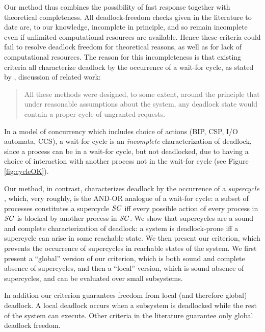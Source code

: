 Our method thus combines the possibility of fast response together with theoretical completeness.
All deadlock-freedom checks given in the literature to date are, to our knowledge, incomplete in
principle, and so remain incomplete even if unlimited computational resources are available.
Hence these criteria could fail to resolve deadlock freedom for theoretical reasons, as well as for 
lack of computational resources.
%
The reason for this incompleteness is that existing criteria all characterize deadlock by the
occurrence of a wait-for cycle, \eg as stated by , discussion of related
work:
\begin{quote}
All these methods were designed, to some extent, around the principle that under reasonable
assumptions about the system, any deadlock state would contain a proper cycle of ungranted requests.
\end{quote}
In a model of concurrency which includes choice of actions
(\eg BIP, CSP, I/O automata, CCS), a wait-for cycle is an \emph{incomplete} characterization of
deadlock, since a process can be in a wait-for cycle, but not deadlocked, due to having a choice of
interaction with another process not in the wait-for cycle (see Figure \ref{fig:cycleOK}).

Our method, in contrast, characterizes deadlock by the occurrence of a \emph{supercycle} \cite{AE98,AC05}, which, very roughly, is the AND-OR analogue
of a wait-for cycle: a subset of processes constitutes a supercycle $\mathit{SC}$ iff every possible action of every process in $\mathit{SC}$ is blocked by another
process in $\mathit{SC}$.
%
We show that supercycles are a sound and complete characterization of deadlock: a system is deadlock-prone iff a supercycle can arise in some
reachable state.
%
We then present our criterion, which prevents the occurrence of supercycles in reachable states of
the system. We first present a ``global'' version of our criterion, which is both sound and complete
\wrt absence of supercycles, and then a ``local'' version, which is sound \wrt absence of
supercycles, and can be evaluated over small subsystems.

In addition our criterion guarantees freedom from local (and therefore global) deadlock. A local deadlock occurs when 
a subsystem is deadlocked while the rest of the system can execute. Other criteria in the literature \cite{AGR16,Ma96,RD87,DFinder2,BR91,MM12,GS03,AB03} guarantee only global deadlock freedom.

